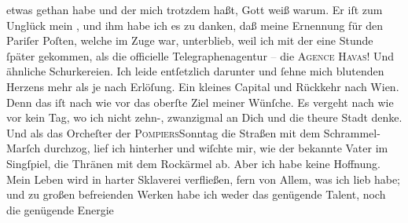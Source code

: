                etwas gethan habe und der mich trotzdem haßt, Gott weiß warum. Er iſt zum Unglück
               mein \label{K_L02669-14v}\label{K_L02669-14}, und ihm
               habe ich es zu danken, daß \strikeout{\textcolor{gray}{man}} meine Ernennung für den Pariſer Poſten,
               welche im Zuge war, unterblieb, weil ich mit der \label{K_L02669-15v}\label{K_L02669-15} eine Stunde{ }ſpäter gekommen, als die officielle
               Telegraphenagentur \textcolor{gray}{–} die \textsc{Agence Havas}! Und ähnliche Schurkereien. Ich leide entſetzlich darunter und{ }ſehne mich
               blutenden Herzens mehr als je nach Erlöſung. Ein kleines Capital und Rückkehr nach
                  Wien. Denn das iſt nach wie vor das oberſte
               Ziel meiner Wünſche. Es vergeht nach wie vor kein Tag, {\pb}wo ich nicht zehn-, zwanzigmal an Dich und die
               theure Stadt denke. Und als das
                  Orcheſter der \textsc{Pompiers}Sonntag die Straßen mit dem Schrammel-Marſch durchzog, lief ich
               hinterher und wiſchte mir, wie der bekannte Vater im Singſpiel, die Thränen mit dem Rockärmel
               ab. Aber ich habe keine Hoffnung. Mein Leben wird in harter Sklaverei verfließen,
               fern von Allem, was ich lieb habe; und zu großen befreienden Werken habe ich weder
               das genügende Talent, noch die genügende Energie{\dotsfive}\pend
           

